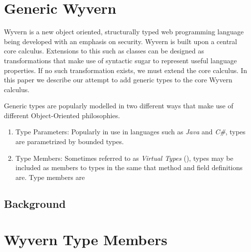 \documentclass{llncs}
\numberwithin{subcase}{casethm}
\numberwithin{casethm}{theorem}
\numberwithin{casethm}{lemma}
\begin{document}
\section{Generic Wyvern}
Wyvern is a new object oriented, structurally typed 
web programming language being developed with an emphasis 
on security. Wyvern is built upon a central core calculus. 
Extensions to this such as classes 
can be designed as transformations that make use of syntactic 
sugar to represent useful language properties. If no such 
transformation exists, we must extend the core calculus. 
In this paper we describe our attempt to add generic types 
to the core Wyvern calculus. 

Generic types are popularly modelled in two different ways 
that make use of different Object-Oriented philosophies. 

\begin{enumerate}
\item Type Parameters: Popularly in use in languages such as 
\emph{Java} and \emph{C\#}, types are parametrized by bounded 
types. 

\item Type Members: Sometimes referred to as \emph{Virtual Types} 
(\cite{1999 virtual types paper}), types may be included as members to 
types in the same that method and field definitions are. Type members 
are 
\end{enumerate}

\subsection{Background}

\section{Wyvern Type Members}
\end{document}
